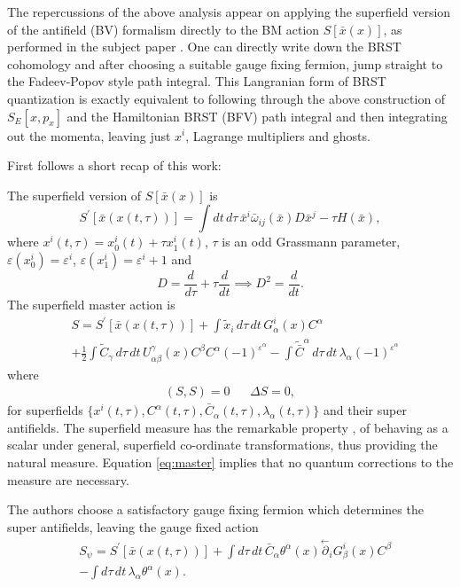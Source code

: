 \documentclass[a4paper,12pt]{article}
\theoremstyle{definition}
\theoremstyle{remark}
\numberwithin{equation}{section}
\newcommand{\al}{\alpha}
\newcommand{\be}{\beta}
\newcommand{\ga}{\gamma}
\newcommand{\la}{\lambda}
\newcommand{\om}{\omega}
\newcommand{\eps}{\varepsilon}
\newcommand{\bx}{\bar{x}}
\newcommand{\tx}{\tilde{x}}
\newcommand{\pl}{\overset{\leftarrow}{\partial}}
\begin{document}
The repercussions of the above analysis appear on applying the
superfield version of the antifield (BV) formalism directly to the
BM action $S[\bx(x)]$, as performed in the subject paper
\cite{Batalin:2001hs}. One can directly write down the BRST
cohomology and after choosing a suitable gauge fixing fermion, jump
straight to the Fadeev-Popov style path integral. This Langranian
form of BRST quantization is exactly equivalent to following
through the above construction of $S_E[x,p_x]$ and the Hamiltonian
BRST (BFV) path integral and then integrating out the momenta,
leaving just $x^i$, Lagrange multipliers and ghosts.

First follows a short recap of this work:

The superfield version of $S[\bx(x)]$ is
\begin{equation}
S^{\prime}[\bx(x(t,\tau))]=\int{dt\,d\tau\,
\bx^i\bar{\om}_{ij}(\bx)D\bx^j} - \tau H(\bx),
\end{equation}
where $x^i(t,\tau)=x^i_0 (t) + \tau x^i_1 (t)$, $\tau$ is an odd
Grassmann parameter, $\eps(x^i_0)=\eps^i$, $\eps(x^i_1)=\eps^i+1$
and
\begin{equation}
D=\frac{d}{d\tau} + \tau\frac{d}{dt} \implies D^2=\frac{d}{dt}.
\end{equation}
The superfield master action is
\begin{equation}
\begin{split}
&S=S^{\prime}[\bx(x(t,\tau))] + \int{\tx_i \, d\tau\, dt\,
G^i_{\al}(x) C^\al}\\
&+ \frac{1}{2} \int{\tilde{C}_{\ga}\, d\tau \,
dt\, U^{\ga}_{\al\be}(x)C^{\be}C^{\al}(-1)^{\eps^\al}}
- \int{\tilde{\bar{C}}^{\al}\, d\tau\, dt\,
\la_{\al}(-1)^{\eps^{\al}}}
\end{split}
\end{equation}
where
\begin{eqnarray}\label{eq:master}
(S,S)=0 && \Delta S=0,
\end{eqnarray}
for superfields $\{x^i(t,\tau), C^\al(t,\tau), \bar{C}_\al(t,\tau),
\la_\al(t,\tau)\}$ and their super antifields. The superfield
measure has the remarkable property \cite{Batalin:1998pz}, of
behaving as a scalar under general, superfield co-ordinate
transformations, thus providing the natural measure. Equation
\eqref{eq:master} implies that no quantum corrections to the
measure are necessary.

The authors choose a satisfactory gauge fixing fermion which
determines the super antifields, leaving the gauge fixed action
\begin{equation}\label{eq:gfmaster}
\begin{split}
&S_{\psi}=S^{\prime}[\bx(x(t,\tau))] +
\int{d\tau\, dt\, \bar{C}_{\al} \theta^{\al}(x)\pl_i
G^i_{\be}(x)C^{\be}}\\
&- \int{d\tau\, dt\, \la_{\al} \theta^{\al}(x)}.
\end{split}
\end{equation}
\end{document}
